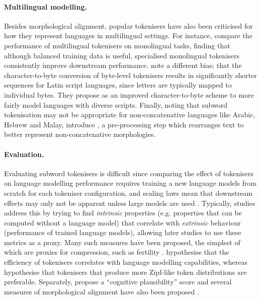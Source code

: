 \paragraph{Multilingual modelling.} Besides morphological alignment, popular tokenisers have also been criticised for how they represent languages in multilingual settings. For instance, \citet{rust-etal-2021} compare the performance of multilingual tokenisers on monolingual tasks, finding that although balanced training data is useful, specialised monolingual tokenisers consistently improve downstream performance. \citet{limisiewicz-etal-2024-myte} note a different bias; that the character-to-byte conversion of byte-level \bpe tokenisers results in significantly shorter sequences for Latin script languages, since letters are typically mapped to individual bytes. They propose  as an improved character-to-byte scheme to more fairly model languages with diverse scripts. Finally, noting that subword tokenisation may not be appropriate for non-concatenative languages like Arabic, Hebrew and Malay, \citet{gazit2025splinteringnonconcatenativelanguagesbetter} introduce , a pre-processing step which rearranges text to better represent non-concatenative morphologies.

\paragraph{Evaluation.} Evaluating subword tokenisers is difficult since comparing the effect of tokenisers on language modelling performance requires training a new language models from scratch for each tokeniser configuration, and scaling laws mean that downstream effects may only not be apparent unless large models are used \citep{wei2022emergent}. Typically, studies address this by trying to find \emph{intrinsic} properties (e.g. properties that can be computed without a language model) that correlate with \emph{extrinsic} behaviour (performance of trained language models), allowing later studies to use these metrics as a proxy. Many such measures have been proposed, the simplest of which are proxies for compression, such as fertility \citep{acs2019exploring}. \citet{zouhar-etal-2023-tokenization} hypothesise that the \renyi efficiency of tokenisers correlates with language modelling capabilities, whereas \citet{lotz2025beyond} hypothesise that tokenisers that produce more Zipf-like token distributions are preferable. Separately, \citet{beinborn-pinter-2023-analyzing} propose a ``cognitive plausibility'' score and several measures of morphological alignment have also been proposed \citep{gow-smith-etal-2022-improving, batsuren2024evaluating, arnett2025language}.

